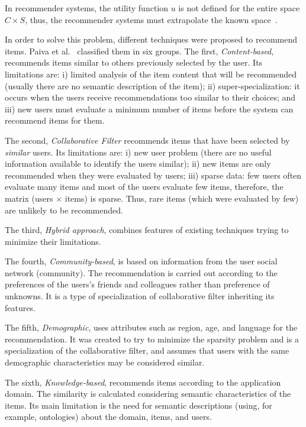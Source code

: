\documentclass{sig-alternate-05-2015}
\begin{document}
In recommender systems, the utility function \(u\) is not defined for the entire space \(C \times S\), thus, the recommender systems must extrapolate the known space~\cite{Adomavicius2005}.

In order to solve this problem, different techniques were proposed to recommend items. Paiva et al.~\cite{Paiva2013} classified them in six groups. The first, \emph{Content-based}, recommends items similar to others previously selected by the user. Its limitations are: i) limited analysis of the item content that will be recommended (usually there are no semantic description of the item); ii) super-specialization: it occurs when the users receive recommendations too similar to their choices; and iii) new users must evaluate a minimum number of items before the system can recommend items for them.

The second, \emph{Collaborative Filter} recommends items that have been selected by \emph{similar} users. Its limitations are: i) new user problem (there are no useful information available to identify the users similar); ii) new items are only recommended when they were evaluated by users; iii) sparse data: few users often evaluate many items and most of the users evaluate few items, therefore, the matrix (users \(\times\) items) is sparse. Thus, rare items (which were evaluated by few) are unlikely to be recommended.

The third, \emph{Hybrid approach}, combines features of existing techniques trying to minimize their limitations.

The fourth, \emph{Community-based}, is based on information from the user social network (community). The recommendation is carried out according to the preferences of the users's friends and colleagues rather than preference of unknowns. It is a type of specialization of collaborative filter inheriting its features.

The fifth, \emph{Demographic}, uses attributes such as region, age, and language for the recommendation. It was created to try to minimize the sparsity problem and is a specialization of the collaborative filter, and assumes that users with the same demographic characteristics may be considered similar.

The sixth, \emph{Knowledge-based}, recommends items according to the application domain. The similarity is calculated considering semantic characteristics of the items. Its main limitation is the need for semantic descriptions (using, for example, ontologies) about the domain, items, and users.
\end{document}
